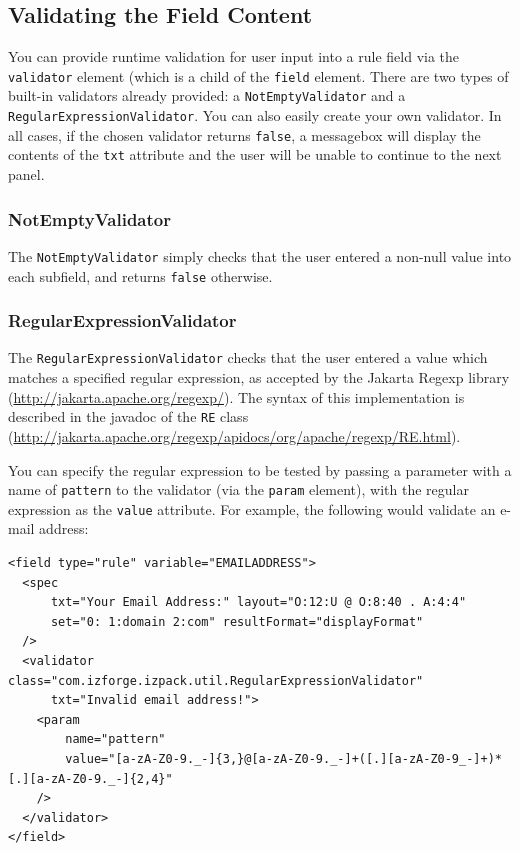 \subsection{Validating the Field Content}

You can provide runtime validation for user input into a rule field via the 
\texttt{validator} element (which is a child of the \texttt{field} element.  
There are two types of built-in validators already provided: a 
\texttt{NotEmptyValidator} and a \texttt{RegularExpressionValidator}.  You can
 also easily create your own validator.  In all cases, if the chosen validator
 returns \texttt{false}, a messagebox will display the contents of the 
\texttt{txt} attribute and the user will be unable to continue to the next panel.\\

\subsubsection{NotEmptyValidator}

The \texttt{NotEmptyValidator} simply checks that the user entered a non-null 
value into each subfield, and returns \texttt{false} otherwise.\\

\subsubsection{RegularExpressionValidator}

The \texttt{RegularExpressionValidator} checks that the user entered a 
value which matches a specified regular expression, as accepted by the Jakarta
Regexp library 
(\url{http://jakarta.apache.org/regexp/}).  The syntax of this implementation
is described in the javadoc of the \texttt{RE} class 
(\url{http://jakarta.apache.org/regexp/apidocs/org/apache/regexp/RE.html}).

You can specify the regular 
expression to be tested by passing a parameter with a name of \texttt{pattern} 
to the validator (via the \texttt{param} element), with the regular expression
as the \texttt{value} attribute.  For example, the following would validate 
an e-mail address:\\

\footnotesize
\begin{verbatim}
<field type="rule" variable="EMAILADDRESS"> 
  <spec 
      txt="Your Email Address:" layout="O:12:U @ O:8:40 . A:4:4" 
      set="0: 1:domain 2:com" resultFormat="displayFormat"
  />
  <validator class="com.izforge.izpack.util.RegularExpressionValidator" 
      txt="Invalid email address!">
    <param 
        name="pattern" 
        value="[a-zA-Z0-9._-]{3,}@[a-zA-Z0-9._-]+([.][a-zA-Z0-9_-]+)*[.][a-zA-Z0-9._-]{2,4}"
    />
  </validator> 
</field>
\end{verbatim}
\normalsize

